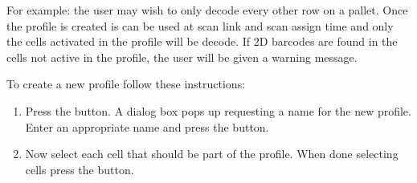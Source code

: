 For example: the user may wish to only decode every other row on a pallet. Once
the profile is created is can be used at scan link and scan assign time and
only the cells activated in the profile will be decode. If 2D barcodes are
found in the cells not active in the profile, the user will be given a warning
message.

To create a new profile follow these instructions:
\begin{enumerate}
  \item Press the  button. A dialog box pops up requesting a name
    for the new profile. Enter an appropriate name and press the 
    button.
  \item Now select each cell that should be part of the profile. When done
    selecting cells press the  button.
\end{enumerate}

